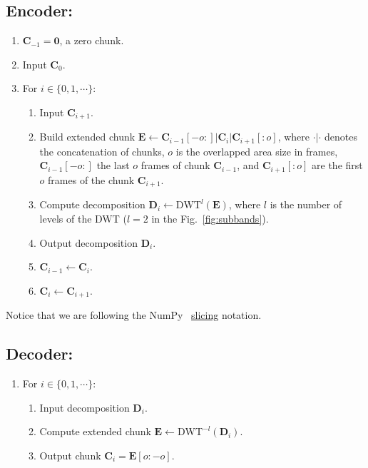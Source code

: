 \subsection*{Encoder:}
\begin{enumerate}
\item ${\mathbf C}_{-1}={\mathbf 0}$, a zero chunk.
\item Input ${\mathbf C}_0$.
\item For $i\in\{0,1,\cdots\}$:   
  \begin{enumerate}               
  \item Input ${\mathbf C}_{i+1}$.
  \item Build extended chunk ${\mathbf E}\leftarrow {\mathbf
    C}_{i-1}[-o:]|{\mathbf C}_i|{\mathbf C}_{i+1}[:o]$, where
    $\cdot|\cdot$ denotes the concatenation of chunks, $o$ is the
    overlapped area size in frames, ${\mathbf C}_{i-1}[-o:]$ the last
    $o$ frames of chunk ${\mathbf C}_{i-1}$, and ${\mathbf
      C}_{i+1}[:o]$ are the first $o$ frames of the chunk ${\mathbf
      C}_{i+1}$.
  \item Compute decomposition ${\mathbf D}_i \leftarrow
    \text{DWT}^l({\mathbf E})$, where $l$ is the number of levels of
    the DWT ($l=2$ in the Fig.~\ref{fig:subbands}).
  \item Output decomposition ${\mathbf D}_i$.
  \item ${\mathbf C}_{i-1}\leftarrow {\mathbf C}_i$.
  \item ${\mathbf C}_i\leftarrow {\mathbf C}_{i+1}$.
  \end{enumerate}
\end{enumerate}

Notice that we are following the NumPy~\cite{numpy,harris2020array}
\href{https://www.pythoninformer.com/python-libraries/numpy/index-and-slice/}{slicing} notation.


\subsection*{Decoder:}
\begin{enumerate}
\item For $i\in\{0,1,\cdots\}$:
  \begin{enumerate}
  \item Input decomposition ${\mathbf D}_i$.
  \item Compute extended chunk ${\mathbf E}\leftarrow\text{DWT}^{-l}({\mathbf D}_i)$.
  \item Output chunk ${\mathbf C}_i={\mathbf E}[o:-o]$.
  \end{enumerate}
\end{enumerate}

